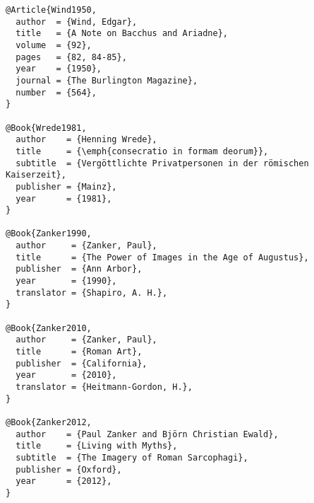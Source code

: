 \documentclass[a4paper,
10pt,
english
]{ltxdoc}
\begin{document}
\begin{lstlisting}
@Article{Wind1950,
  author  = {Wind, Edgar},
  title   = {A Note on Bacchus and Ariadne},
  volume  = {92},
  pages   = {82, 84-85},
  year    = {1950},
  journal = {The Burlington Magazine},
  number  = {564},
}

@Book{Wrede1981,
  author    = {Henning Wrede},
  title     = {\emph{consecratio in formam deorum}},
  subtitle  = {Vergöttlichte Privatpersonen in der römischen Kaiserzeit},
  publisher = {Mainz},
  year      = {1981},
}

@Book{Zanker1990,
  author     = {Zanker, Paul},
  title      = {The Power of Images in the Age of Augustus},
  publisher  = {Ann Arbor},
  year       = {1990},
  translator = {Shapiro, A. H.},
}

@Book{Zanker2010,
  author     = {Zanker, Paul},
  title      = {Roman Art},
  publisher  = {California},
  year       = {2010},
  translator = {Heitmann-Gordon, H.},
}

@Book{Zanker2012,
  author    = {Paul Zanker and Björn Christian Ewald},
  title     = {Living with Myths},
  subtitle  = {The Imagery of Roman Sarcophagi},
  publisher = {Oxford},
  year      = {2012},
}

\end{lstlisting}
\end{document}

